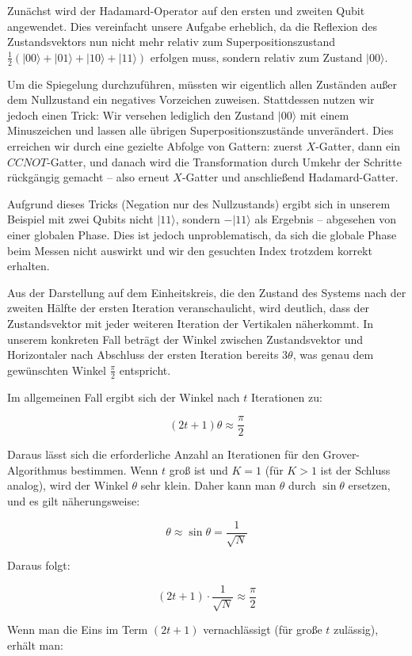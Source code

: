 {Zunächst wird der Hadamard-Operator auf den ersten und zweiten Qubit angewendet. Dies vereinfacht unsere Aufgabe erheblich, da die Reflexion des Zustandsvektors nun nicht mehr relativ zum Superpositionszustand $\frac{1}{2}(|00\rangle + |01\rangle + |10\rangle + |11\rangle)$ erfolgen muss, sondern relativ zum Zustand $|00\rangle$.

Um die Spiegelung durchzuführen, müssten wir eigentlich allen Zuständen außer dem Nullzustand ein negatives Vorzeichen zuweisen. Stattdessen nutzen wir jedoch einen Trick: Wir versehen lediglich den Zustand $|00\rangle$ mit einem Minuszeichen und lassen alle übrigen Superpositionszustände unverändert. Dies erreichen wir durch eine gezielte Abfolge von Gattern: zuerst $X$-Gatter, dann ein $CCNOT$-Gatter, und danach wird die Transformation durch Umkehr der Schritte rückgängig gemacht – also erneut $X$-Gatter und anschließend Hadamard-Gatter.

Aufgrund dieses Tricks (Negation nur des Nullzustands) ergibt sich in unserem Beispiel mit zwei Qubits nicht $|11\rangle$, sondern $-|11\rangle$ als Ergebnis – abgesehen von einer globalen Phase. Dies ist jedoch unproblematisch, da sich die globale Phase beim Messen nicht auswirkt und wir den gesuchten Index trotzdem korrekt erhalten.

Aus der Darstellung auf dem Einheitskreis, die den Zustand des Systems nach der zweiten Hälfte der ersten Iteration veranschaulicht, wird deutlich, dass der Zustandsvektor mit jeder weiteren Iteration der Vertikalen näherkommt. In unserem konkreten Fall beträgt der Winkel zwischen Zustandsvektor und Horizontaler nach Abschluss der ersten Iteration bereits $3\theta$, was genau dem gewünschten Winkel $\frac{\pi}{2}$ entspricht.

Im allgemeinen Fall ergibt sich der Winkel nach $t$ Iterationen zu:

$$
(2t + 1)\theta \approx \frac{\pi}{2}
$$

Daraus lässt sich die erforderliche Anzahl an Iterationen für den Grover-Algorithmus bestimmen. Wenn $t$ groß ist und $K = 1$ (für $K > 1$ ist der Schluss analog), wird der Winkel $\theta$ sehr klein. Daher kann man $\theta$ durch $\sin{\theta}$ ersetzen, und es gilt näherungsweise:

$$
\theta \approx \sin{\theta} = \frac{1}{\sqrt{N}}
$$

Daraus folgt:

$$
(2t + 1) \cdot \frac{1}{\sqrt{N}} \approx \frac{\pi}{2}
$$

Wenn man die Eins im Term $(2t + 1)$ vernachlässigt (für große $t$ zulässig), erhält man:

}
